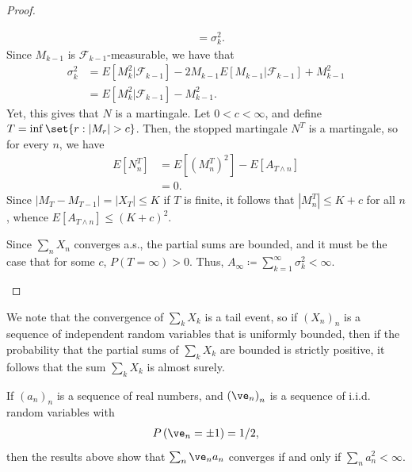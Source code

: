 \documentclass[10pt]{mypackage}
\renewcommand{\coloneq}{\coloneqq}
\begin{document}
\begin{proof}
\begin{enumerate}[(a)]
\begin{align*}
                                                                       &= \sigma_k^2.
      \end{align*}
      Since $M_{k-1}$ is $\mathcal{F}_{k-1}$-measurable, we have that
      \begin{align*}
        \sigma_k^2 &= E\left[ M_k^2|\mathcal{F}_{k-1} \right] - 2M_{k-1}E\left[ M_{k-1}|\mathcal{F}_{k-1} \right] + M_{k-1}^2\\
                   &= E\left[ M_{k}^2|\mathcal{F}_{k-1} \right]-M_{k-1}^2.
      \end{align*}
      Yet, this gives that $N$ is a martingale. Let $0 < c < \infty$, and define $T = \inf\set{r : \left\vert M_r \right\vert > c}$. Then, the stopped martingale $N^T$ is a martingale, so for every $n$, we have
      \begin{align*}
        E\left[ N_n^{T} \right] &= E\left[ \left( M_n^{T} \right)^2 \right]-E\left[ A_{T\wedge n} \right]\\
                                &= 0.
      \end{align*}
      Since $\left\vert M_T-M_{T-1} \right\vert = \left\vert X_T \right\vert\leq K$ if $T$ is finite, it follows that $\left\vert M_n^T \right\vert\leq K + c$ for all $n$, whence $E\left[ A_{T\wedge n} \right] \leq \left( K+c \right)^2$.

      Since $\sum_{n}X_n$ converges a.s., the partial sums are bounded, and it must be the case that for some $c$, $P\left( T = \infty \right) > 0$. Thus, $A_{\infty}\coloneq \sum_{k=1}^{\infty}\sigma_k^2 < \infty$.
  \end{enumerate}
\end{proof}
\begin{remark}
  We note that the convergence of $\sum_{k}X_k$ is a tail event, so if $\left( X_n \right)_n$ is a sequence of independent random variables that is uniformly bounded, then if the probability that the partial sums of $\sum_{k}X_k$ are bounded is strictly positive, it follows that the sum $\sum_{k}X_k$ is almost surely.
\end{remark}
\begin{example}
  If $\left( a_n \right)_n$ is a sequence of real numbers, and $\left( \ve_n \right)_n$ is a sequence of i.i.d. random variables with 
  \begin{align*}
    P\left( \ve_n = \pm 1 \right) = 1/2,
  \end{align*}
  then the results above show that $\sum_{n}\ve_na_n$ converges if and only if $\sum_{n}a_n^2 < \infty$.
\end{example}
\end{document}
